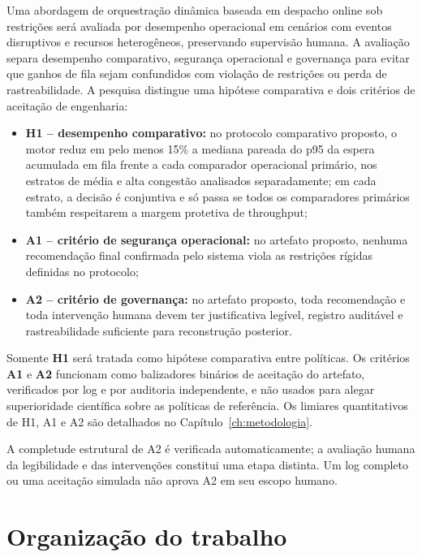 \documentclass[
  12pt,
  oneside,
  a4paper,
  sumario=tradicional,
  brazil
]{abntex2}
\begin{document}
Uma abordagem de orquestra\c{c}\~ao din\^amica baseada em despacho online sob restri\c{c}\~oes ser\'a avaliada por desempenho operacional em cen\'arios com eventos disruptivos e recursos heterog\^eneos, preservando supervis\~ao humana. A avalia\c{c}\~ao separa desempenho comparativo, seguran\c{c}a operacional e governan\c{c}a para evitar que ganhos de fila sejam confundidos com viola\c{c}\~ao de restri\c{c}\~oes ou perda de rastreabilidade. A pesquisa distingue uma hip\'otese comparativa e dois crit\'erios de aceita\c{c}\~ao de engenharia:
\begin{itemize}[leftmargin=1.27cm,itemsep=0pt,topsep=0pt,parsep=0pt,partopsep=0pt]
  \item \textbf{H1 -- desempenho comparativo:} no protocolo comparativo proposto, o motor reduz em pelo menos 15\% a mediana pareada do p95 da espera acumulada em fila frente a cada comparador operacional prim\'ario, nos estratos de m\'edia e alta congest\~ao analisados separadamente; em cada estrato, a decis\~ao \'e conjuntiva e s\'o passa se todos os comparadores prim\'arios tamb\'em respeitarem a margem protetiva de throughput;
  \item \textbf{A1 -- crit\'erio de seguran\c{c}a operacional:} no artefato proposto, nenhuma recomenda\c{c}\~ao final confirmada pelo sistema viola as restri\c{c}\~oes r\'igidas definidas no protocolo;
  \item \textbf{A2 -- crit\'erio de governan\c{c}a:} no artefato proposto, toda recomenda\c{c}\~ao e toda interven\c{c}\~ao humana devem ter justificativa leg\'ivel, registro audit\'avel e rastreabilidade suficiente para reconstru\c{c}\~ao posterior.
\end{itemize}
Somente \textbf{H1} ser\'a tratada como hip\'otese comparativa entre pol\'iticas. Os crit\'erios \textbf{A1} e \textbf{A2} funcionam como balizadores bin\'arios de aceita\c{c}\~ao do artefato, verificados por log e por auditoria independente, e n\~ao usados para alegar superioridade cient\'ifica sobre as pol\'iticas de refer\^encia. Os limiares quantitativos de H1, A1 e A2 s\~ao detalhados no Cap\'itulo~\ref{ch:metodologia}.

A completude estrutural de A2 \'e verificada automaticamente; a avalia\c{c}\~ao humana da legibilidade e das interven\c{c}\~oes constitui uma etapa distinta. Um log completo ou uma aceita\c{c}\~ao simulada n\~ao aprova A2 em seu escopo humano.

\section{Organização do trabalho}
\end{document}
